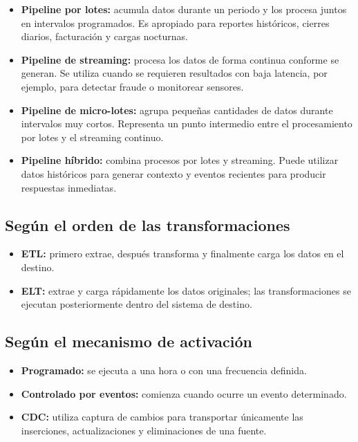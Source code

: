 \begin{itemize}
    \item \textbf{Pipeline por lotes:} acumula datos durante un periodo y los
    procesa juntos en intervalos programados. Es apropiado para reportes
    históricos, cierres diarios, facturación y cargas nocturnas.

    \item \textbf{Pipeline de streaming:} procesa los datos de forma continua
    conforme se generan. Se utiliza cuando se requieren resultados con baja
    latencia, por ejemplo, para detectar fraude o monitorear sensores.

    \item \textbf{Pipeline de micro-lotes:} agrupa pequeñas cantidades de datos
    durante intervalos muy cortos. Representa un punto intermedio entre el
    procesamiento por lotes y el streaming continuo.

    \item \textbf{Pipeline híbrido:} combina procesos por lotes y streaming.
    Puede utilizar datos históricos para generar contexto y eventos recientes
    para producir respuestas inmediatas.
\end{itemize}

\subsection*{Según el orden de las transformaciones}

\begin{itemize}
    \item \textbf{ETL:} primero extrae, después transforma y finalmente carga
    los datos en el destino.

    \item \textbf{ELT:} extrae y carga rápidamente los datos originales; las
    transformaciones se ejecutan posteriormente dentro del sistema de destino.
\end{itemize}

\subsection*{Según el mecanismo de activación}

\begin{itemize}
    \item \textbf{Programado:} se ejecuta a una hora o con una frecuencia definida.
    \item \textbf{Controlado por eventos:} comienza cuando ocurre un evento determinado.
    \item \textbf{CDC:} utiliza captura de cambios para transportar únicamente las inserciones, actualizaciones y eliminaciones de una fuente.
\end{itemize}

